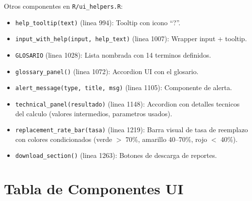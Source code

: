 \documentclass[11pt, letterpaper, twoside]{report}
\begin{document}
\begin{codigobox}
Otros componentes en \texttt{R/ui\_helpers.R}:
\begin{itemize}[nosep]
\item \texttt{help\_tooltip(text)} (linea 994): Tooltip con icono ``?''.
\item \texttt{input\_with\_help(input, help\_text)} (linea 1007): Wrapper input + tooltip.
\item \texttt{GLOSARIO} (linea 1028): Lista nombrada con 14 terminos definidos.
\item \texttt{glossary\_panel()} (linea 1072): Accordion UI con el glosario.
\item \texttt{alert\_message(type, title, msg)} (linea 1105): Componente de alerta.
\item \texttt{technical\_panel(resultado)} (linea 1148): Accordion con detalles tecnicos
      del calculo (valores intermedios, parametros usados).
\item \texttt{replacement\_rate\_bar(tasa)} (linea 1219): Barra visual de tasa de reemplazo
      con colores condicionados (verde $>$ 70\%, amarillo 40--70\%, rojo $<$ 40\%).
\item \texttt{download\_section()} (linea 1263): Botones de descarga de reportes.
\end{itemize}
\end{codigobox}


\section{Tabla de Componentes UI}
\end{document}
